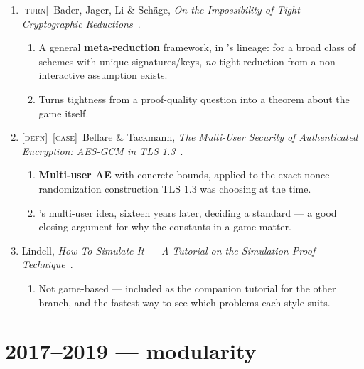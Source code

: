 \documentclass[11pt]{article}
\newcommand{\kind}[1]{{\footnotesize\textsc{\textcolor{yearcolor}{[#1]}}}\ }
\newcommand{\defn}{\kind{defn}}
\newcommand{\turn}{\kind{turn}}
\newcommand{\case}{\kind{case}}
\newcommand{\paper}[3]{#1, \emph{#2}~\cite{#3}.}
\begin{document}
\begin{enumerate}
  \item \turn \paper{Bader, Jager, Li \& Schäge}{On the Impossibility of Tight
    Cryptographic Reductions}{BJLS16}
    \begin{enumerate}
      \item A general \textbf{meta-reduction} framework, in \cite{Cor00}'s
        lineage: for a broad class of schemes with unique signatures/keys,
        \emph{no} tight reduction from a non-interactive assumption exists.
      \item Turns tightness from a proof-quality question into a theorem about
        the game itself.
    \end{enumerate}

  \item \defn\case \paper{Bellare \& Tackmann}{The Multi-User Security of
    Authenticated Encryption: AES-GCM in TLS 1.3}{BT16}
    \begin{enumerate}
      \item \textbf{Multi-user AE} with concrete bounds, applied to the exact
        nonce-randomization construction TLS 1.3 was choosing at the time.
      \item \cite{BBM00}'s multi-user idea, sixteen years later, deciding a
        standard --- a good closing argument for why the constants in a game
        matter.
    \end{enumerate}

  \item \paper{Lindell}{How To Simulate It --- A Tutorial on the Simulation
    Proof Technique}{Lin16}
    \begin{enumerate}
      \item Not game-based --- included as the companion tutorial for the other
        branch, and the fastest way to see which problems each style suits.
    \end{enumerate}
\end{enumerate}

\section{2017--2019 --- modularity}
\end{document}

